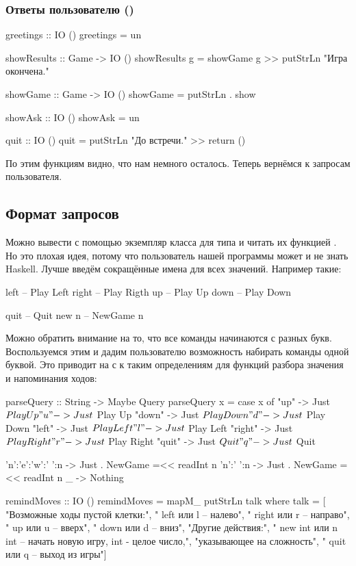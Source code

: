 \subsubsection{Ответы пользователю ()}


\begin{code}
greetings :: IO ()
greetings = un

showResults :: Game -> IO ()
showResults g = showGame g >> putStrLn "Игра окончена."

showGame :: Game -> IO ()
showGame = putStrLn . show

showAsk :: IO ()
showAsk = un

quit :: IO ()
quit = putStrLn "До встречи." >> return ()
\end{code}

По этим функциям видно, что нам немного осталось. Теперь вернёмся к
запросам пользователя.

\subsection{Формат запросов}

Можно вывести с помощью  экземпляр класса  для
типа  и читать их функцией . Но это плохая идея,
потому что пользователь нашей программы может и не знать Haskell. Лучше
введём сокращённые имена для всех значений. Например такие:


\begin{code}
left        -- Play Left
right       -- Play Rigth
up          -- Play Up
down        -- Play Down

quit        -- Quit
new n       -- NewGame n
\end{code}

Можно обратить внимание на то, что все команды начинаются с разных букв.
Воспользуемся этим и дадим пользователю возможность набирать команды
одной буквой. Это приводит на с к таким определениям для функций разбора
значения и напоминания ходов:


\begin{code}
parseQuery :: String -> Maybe Query
parseQuery x = case x of
    "up"    -> Just $ Play Up
    "u"     -> Just $ Play Up
    "down"  -> Just $ Play Down 
    "d"     -> Just $ Play Down 
    "left"  -> Just $ Play Left
    "l"     -> Just $ Play Left
    "right" -> Just $ Play Right
    "r"     -> Just $ Play Right
    "quit"  -> Just $ Quit
    "q"     -> Just $ Quit

    'n':'e':'w':' ':n   -> Just . NewGame =<< readInt n
    'n':' ':n           -> Just . NewGame =<< readInt n  
    _       -> Nothing

remindMoves :: IO ()
remindMoves = mapM_ putStrLn talk
    where talk = [
            "Возможные ходы пустой клетки:",
            "   left     или l       -- налево",
            "   right    или r       -- направо",
            "   up       или u       -- вверх",
            "   down     или d       -- вниз",
            "Другие действия:",
            "   new int  или n int -- начать новую игру, int - целое число,", 
                                      "указывающее на сложность",
            "   quit     или q      -- выход из игры"]
\end{code}


